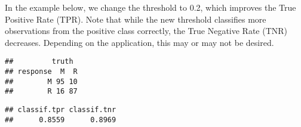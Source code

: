 \documentclass[
]{scrbook}
\newenvironment{Shaded}{\begin{snugshade}}{\end{snugshade}}
\newcommand{\AttributeTok}[1]{\textcolor[rgb]{0.77,0.63,0.00}{#1}}
\newcommand{\CommentTok}[1]{\textcolor[rgb]{0.56,0.35,0.01}{\textit{#1}}}
\newcommand{\FloatTok}[1]{\textcolor[rgb]{0.00,0.00,0.81}{#1}}
\newcommand{\FunctionTok}[1]{\textcolor[rgb]{0.00,0.00,0.00}{#1}}
\newcommand{\NormalTok}[1]{#1}
\newcommand{\OtherTok}[1]{\textcolor[rgb]{0.56,0.35,0.01}{#1}}
\newcommand{\SpecialCharTok}[1]{\textcolor[rgb]{0.00,0.00,0.00}{#1}}
\newcommand{\StringTok}[1]{\textcolor[rgb]{0.31,0.60,0.02}{#1}}
\renewenvironment{Shaded} {\begin{snugshade}\small} {\end{snugshade}}
\begin{document}
In the example below, we change the threshold to 0.2, which improves the True Positive Rate (TPR).
Note that while the new threshold classifies more observations from the positive class correctly, the True Negative Rate (TNR) decreases.
Depending on the application, this may or may not be desired.

\begin{Shaded}
\end{Shaded}

\begin{verbatim}
##         truth
## response  M  R
##        M 95 10
##        R 16 87
\end{verbatim}

\begin{Shaded}
\end{Shaded}

\begin{verbatim}
## classif.tpr classif.tnr 
##      0.8559      0.8969
\end{verbatim}

\begin{Shaded}
\end{Shaded}
\end{document}
